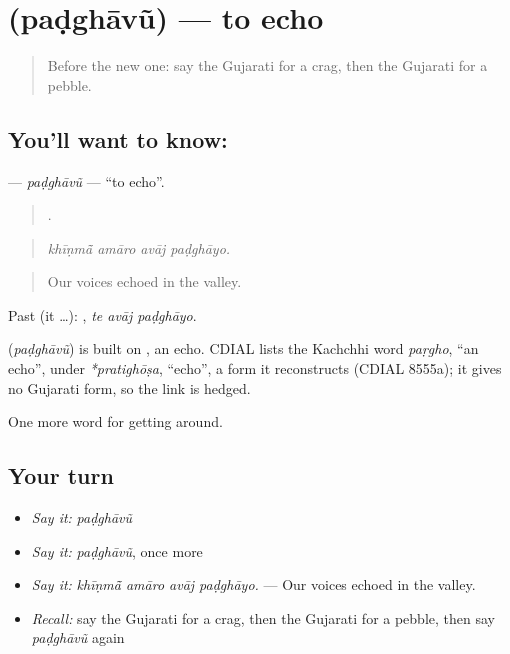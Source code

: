 \section[\texorpdfstring{\gu{પડઘાવું} (paḍghāvũ)}{પડઘાવું (paḍghāvũ)}]{ (paḍghāvũ) — to echo}

\label{lesson:GU-C439-padghavu}



\begin{quote}
Before the new one: say the Gujarati for a crag, then the Gujarati for a pebble.
\end{quote}

\subsection*{You'll want to know: }
\textbf{} — \emph{paḍghāvũ} — \textquotedblleft{}to echo\textquotedblright{}.

\begin{quote}
   .
\end{quote}

\begin{quote}
\emph{khīṇmā̃ amāro avāj paḍghāyo.}
\end{quote}

\begin{quote}
Our voices echoed in the valley.
\end{quote}

Past (it …):   , \emph{te avāj paḍghāyo}.

\begin{cousinweb}
\textbf{} (\emph{paḍghāvũ}) is built on , an echo. CDIAL lists the Kachchhi word \emph{paṛgho}, \textquotedblleft{}an echo\textquotedblright{}, under \emph{*pratighōṣa}, \textquotedblleft{}echo\textquotedblright{}, a form it reconstructs (CDIAL 8555a); it gives no Gujarati form, so the link is hedged.
\end{cousinweb}

\begin{grammarlens}[title={What you've built}]
One more word for getting around.
\end{grammarlens}

\subsection*{Your turn}
\begin{itemize}
\raggedright
  \item \emph{Say it:} \emph{paḍghāvũ}
  \item \emph{Say it:} \emph{paḍghāvũ}, once more
  \item \emph{Say it:} \emph{khīṇmā̃ amāro avāj paḍghāyo.} — Our voices echoed in the valley.
  \item \emph{Recall:} say the Gujarati for a crag, then the Gujarati for a pebble, then say \emph{paḍghāvũ} again
\end{itemize}

